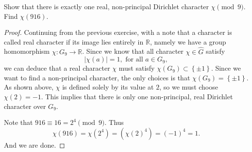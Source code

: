 \documentclass[11pt,letterpaper]{article}
\DeclareMathOperator{\1}{\mathbbm{1}}
\begin{document}
\begin{exercise}
  Show that there is exactly one real, non-principal Dirichlet character $\chi \pmod 9$. Find $\chi(916)$.
\end{exercise}
\begin{proof}
  Continuing from the previous exercise, with a note that a character is called real character if its image lies entirely in
  $\mathbb{R}$, namely  we have a group homomorphism $\chi\colon G_9 \to \mathbb{R}$. Since we know that all character $\chi \in \hat{G}$ satisfy
  \[|\chi(a)| =1, \text{ for all } a \in G_9,\]
  we can deduce that a real character $\chi$ must satisfy $\chi(G_9) \subset \left\lbrace \pm 1 \right\rbrace$. Since
  we want to find a non-principal character, the only choices is that $\chi(G_9) = \left\lbrace \pm 1\right\rbrace$. As shown
  above, $\chi$ is defined solely by its value at $2$, so we must choose $\chi(2) =-1$. This implies that there is only
  one non-principal, real Dirichlet character over $G_9$.

  Note that $916 \equiv 16 = 2^4 \pmod 9$. Thus
  \[ \chi(916) = \chi (2^4) = (\chi(2)^4) = (-1)^4=1.\]
  And we are done.
\end{proof}
\end{document}
